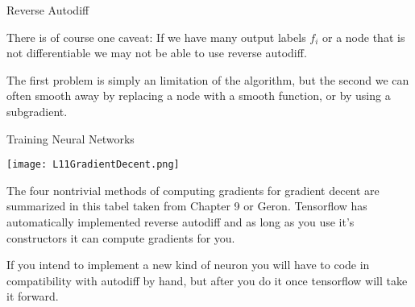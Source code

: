 \documentclass[10pt, table, dvipsnames,xcdraw, handout]{beamer}
\def\layersep{2.5cm}
\begin{document}
\begin{frame}[fragile]{Reverse Autodiff}
\begin{minipage}[t][0.5\textheight][t]{\textwidth}
\hspace{2.5em}
  \end{minipage}
  \vfill
\begin{minipage}[t][0.5\textheight][t]{\textwidth}
There is of course one caveat: If we have many output labels $f_i$ or a node that is not differentiable we may not be able to use reverse autodiff. \pause

The first problem is simply an limitation of the algorithm, but the second we can often smooth away by replacing a node with a smooth function, or by using a subgradient.
\end{minipage}
\end{frame}




\begin{frame}[fragile]{Training Neural Networks}
  \begin{minipage}[t][0.5\textheight][t]{\textwidth}
	\centering \texttt{[image: L11GradientDecent.png]} 
  \end{minipage}
  \vfill
\begin{minipage}[t][0.5\textheight][t]{\textwidth}
The four nontrivial methods of computing gradients for gradient decent are summarized in this tabel taken from Chapter 9 or Geron. Tensorflow has automatically implemented reverse autodiff and as long as you use it's constructors it can compute gradients for you. \pause 

If you intend to implement a new kind of neuron you will have to code in compatibility with autodiff by hand, but after you do it once tensorflow will take it forward. 
\end{minipage}

\end{frame}
\end{document}
